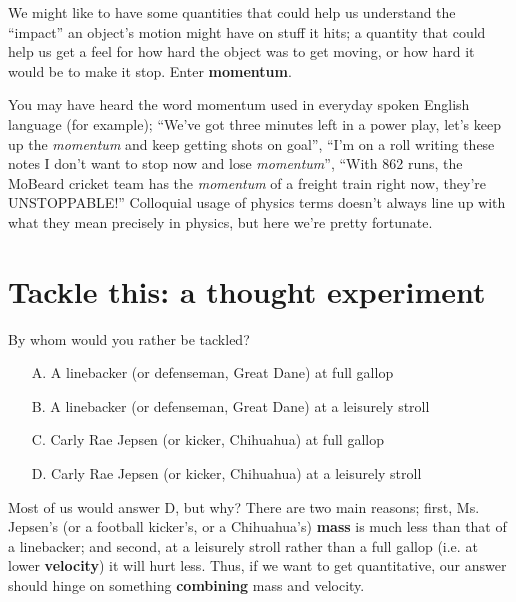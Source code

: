 \documentclass[handout]{tufte-handout}
\begin{document}
We might like to have some quantities that could help us understand the ``impact'' an object's motion might have on stuff it hits; a quantity that could help us get a feel for how hard the object was to get moving, or how hard it would be to make it stop. Enter \textbf{momentum}. 

You may have heard the word momentum used in everyday spoken English language (for example); ``We've got three minutes left in a power play, let's keep up the \emph{momentum} and keep getting shots on goal'', ``I'm on a roll writing these notes I don't want to stop now and lose \emph{momentum}'', ``With 862 runs, the MoBeard cricket team has the \emph{momentum} of a freight train right now, they're UNSTOPPABLE!''  Colloquial usage of physics terms doesn't always line up with what they mean precisely in physics, but here we're pretty fortunate.

\section{Tackle this: a thought experiment}
By whom would you rather be tackled? 
\begin{itemize}
\setlength{\itemsep}{0em}
\item[A.] A linebacker (or defenseman, Great Dane) at full gallop
\item[B.] A linebacker (or defenseman, Great Dane) at a leisurely stroll
\item[C.] Carly Rae Jepsen (or kicker, Chihuahua) at full gallop
\item[D.] Carly Rae Jepsen (or kicker, Chihuahua) at a leisurely stroll
\end{itemize}

Most of us would answer D, but why? There are two main reasons; first, Ms. Jepsen's (or a football kicker's, or a Chihuahua's) \textbf{mass} is much less than that of a linebacker; and second, at a leisurely stroll rather than a full gallop (i.e. at lower \textbf{velocity}) it will hurt less. Thus, if we want to get quantitative, our answer should hinge on something \textbf{combining} mass and velocity. 
\end{document}
